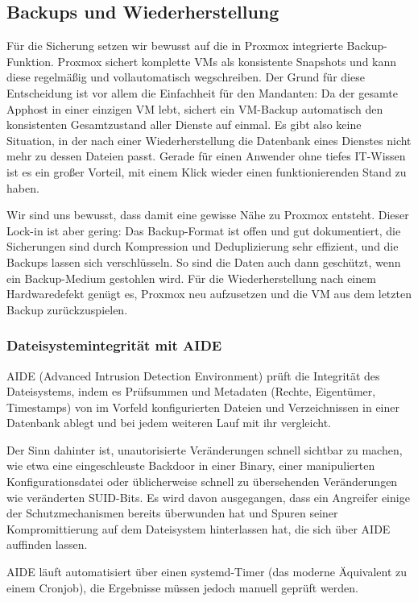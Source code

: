 \subsection{Backups und Wiederherstellung}

Für die Sicherung setzen wir bewusst auf die in Proxmox integrierte
Backup-Funktion. Proxmox sichert komplette \acp{VM} als konsistente Snapshots und
kann diese regelmäßig und vollautomatisch wegschreiben. Der Grund für diese
Entscheidung ist vor allem die Einfachheit für den Mandanten: Da der gesamte
Apphost in einer einzigen \ac{VM} lebt, sichert ein \ac{VM}-Backup automatisch den
konsistenten Gesamtzustand aller Dienste auf einmal. Es gibt also keine Situation,
in der nach einer Wiederherstellung die Datenbank eines Dienstes nicht mehr zu
dessen Dateien passt. Gerade für einen Anwender ohne tiefes \ac{IT}-Wissen ist es
ein großer Vorteil, mit einem Klick wieder einen funktionierenden Stand zu
haben.

Wir sind uns bewusst, dass damit eine gewisse Nähe zu Proxmox entsteht. Dieser
Lock-in ist aber gering: Das Backup-Format ist offen und gut dokumentiert, die
Sicherungen sind durch Kompression und Deduplizierung sehr effizient, und die
Backups lassen sich verschlüsseln. So sind die Daten auch dann geschützt, wenn
ein Backup-Medium gestohlen wird. Für die Wiederherstellung nach einem
Hardwaredefekt genügt es, Proxmox neu aufzusetzen und die \ac{VM} aus dem letzten
Backup zurückzuspielen.

\subsubsection{Dateisystemintegrität mit \acs{AIDE}}
\ac{AIDE} (Advanced Intrusion Detection Environment) prüft die Integrität des Dateisystems, indem es Prüfsummen und Metadaten (Rechte, Eigentümer, Timestamps) von im Vorfeld konfigurierten Dateien und Verzeichnissen in einer Datenbank ablegt und bei jedem weiteren Lauf mit ihr vergleicht. 

Der Sinn dahinter ist, unautorisierte Veränderungen schnell sichtbar zu machen, wie etwa eine eingeschleuste Backdoor in einer Binary, einer manipulierten Konfigurationsdatei oder üblicherweise schnell zu übersehenden Veränderungen wie veränderten \ac{SUID}-Bits. Es wird davon ausgegangen, dass ein Angreifer einige der Schutzmechanismen bereits überwunden hat und Spuren seiner Kompromittierung auf dem Dateisystem hinterlassen hat, die sich über \ac{AIDE} auffinden lassen.

\ac{AIDE} läuft automatisiert über einen systemd-Timer (das moderne Äquivalent zu einem Cronjob), die Ergebnisse müssen jedoch manuell geprüft werden.

